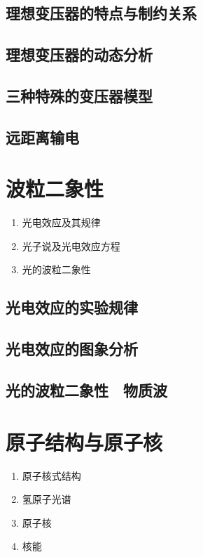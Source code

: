 \documentclass[cn,11pt, simple]{elegantbook}
\begin{document}
\clearpage\section{理想变压器的特点与制约关系}

\clearpage\section{理想变压器的动态分析}

\clearpage\section{三种特殊的变压器模型}

\clearpage\section{远距离输电}

\chapter{波粒二象性}
\begin{enumerate}
   \item 光电效应及其规律
   \item 光子说及光电效应方程
   \item 光的波粒二象性
\end{enumerate}

\clearpage\section{光电效应的实验规律}

\clearpage\section{光电效应的图象分析}

\clearpage\section{光的波粒二象性　物质波}

\chapter{原子结构与原子核}
\begin{enumerate}
   \item 原子核式结构
   \item 氢原子光谱
   \item 原子核
   \item 核能
\end{enumerate}
\end{document}
